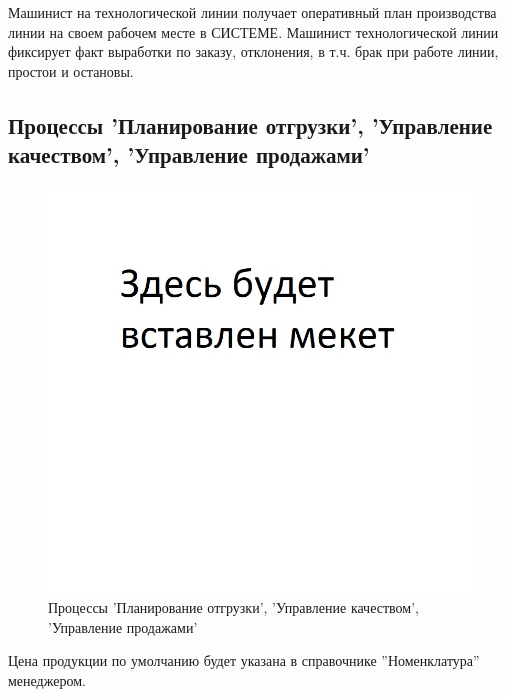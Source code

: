 Машинист на технологической линии получает оперативный план производства линии на своем рабочем месте в СИСТЕМЕ. Машинист технологической линии фиксирует факт выработки по заказу, отклонения, в т.ч. брак при работе линии, простои и остановы.




\subsection{Процессы 'Планирование отгрузки', 'Управление качеством', 'Управление продажами'}
%
\begin{figure}
\begin{center}
  \includegraphics[angle=90, height=0.9\textheight, keepaspectratio]{Pics/Pattern.jpg}
\end{center}
  \caption{Процессы 'Планирование отгрузки', 'Управление качеством', 'Управление продажами'}
  \label{pic:Schema_5}
\end{figure}



Цена продукции по умолчанию будет указана в справочнике ''Номенклатура'' менеджером.


